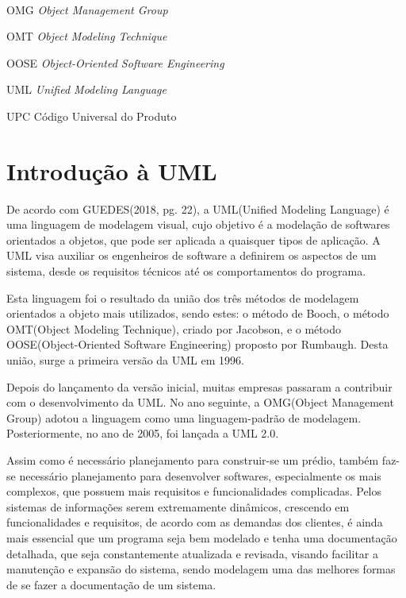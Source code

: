 \documentclass[12pt,openright,oneside,a4paper,
	chapter=TITLE,
	section=TITLE,
	english,brazil]{abntex2}
\author{Heber Ferreira Barra \\ João Gabriel de Cristo}
\date{2024}
\renewcommand{\ABNTEXchapterfont}{\bfseries\MakeUppercase\sffamily}
\renewcommand{\imprimircapa}{%
	\begin{capa}
		\center
		\ABNTEXchapterfont\bfseries\MakeUppercase\imprimirinstituicao\\
		\vspace*{1cm}
		\ABNTEXchapterfont\bfseries\MakeUppercase\imprimirautor
		\vfill
		\begin{center}
			\ABNTEXchapterfont\bfseries\MakeUppercase\imprimirtitulo
		\end{center}
		\vfill

		\bfseries\MakeUppercase\imprimirlocal

		\bfseries\MakeUppercase\imprimirdata

		\vspace*{1cm}
	\end{capa}
}
\begin{document}
\imprimircapa
\imprimirfolhaderosto

\listoffigures*
\cleardoublepage

\begin{siglas}
	\item[OMG] \textit{Object Management Group}
	\item[OMT] \textit{Object Modeling Technique}
	\item[OOSE] \textit{Object-Oriented Software Engineering}
	\item[UML] \textit{Unified Modeling Language}
	\item[UPC] Código Universal do Produto
\end{siglas}

\tableofcontents*
\cleardoublepage

\textual
\chapter{Introdução à UML}
De acordo com GUEDES(2018, pg. 22), a UML(Unified Modeling Language) é uma linguagem de modelagem visual, cujo objetivo é a modelação de softwares orientados a objetos, que pode ser aplicada a quaisquer tipos de aplicação. A UML visa auxiliar os engenheiros de software a definirem os aspectos de um sistema, desde os requisitos técnicos até os comportamentos do programa.

Esta linguagem foi o resultado da união dos três métodos de modelagem orientados a objeto mais utilizados, sendo estes: o método de Booch, o método OMT(Object Modeling Technique), criado por Jacobson, e o método OOSE(Object-Oriented Software Engineering) proposto por Rumbaugh. Desta união, surge a primeira versão da UML em 1996. 

Depois do lançamento da versão inicial, muitas empresas passaram a contribuir com o desenvolvimento da UML. No ano seguinte, a OMG(Object Management Group) adotou a linguagem como uma linguagem-padrão de modelagem. Posteriormente, no ano de 2005, foi lançada a UML 2.0.

Assim como é necessário planejamento para construir-se um prédio, também faz-se necessário planejamento para desenvolver softwares, especialmente os mais complexos, que possuem mais requisitos e funcionalidades complicadas. Pelos sistemas de informações serem extremamente dinâmicos, crescendo em funcionalidades e requisitos, de acordo com as demandas dos clientes, é ainda mais essencial que um programa seja bem modelado e tenha uma documentação detalhada, que seja constantemente atualizada e revisada, visando facilitar  a manutenção e expansão do sistema, sendo modelagem uma das melhores formas de se fazer a documentação de um sistema.
\end{document}
